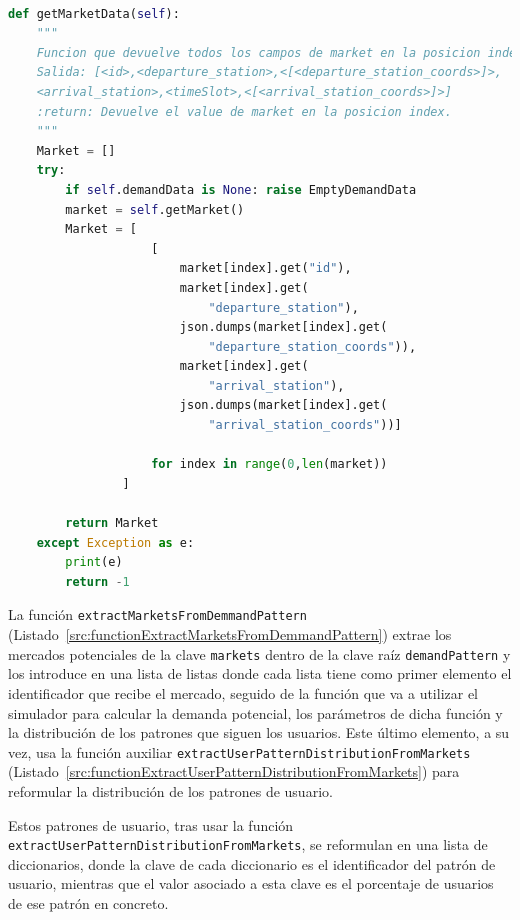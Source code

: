 \begin{lstlisting}[language=Python,
                   style=python,
                   frame=none,
                   numbers=none,
                   basicstyle=\ttfamily\normalsize,
                   caption={Función \texttt{getMarktetData}},
                   label=src:functionGetMarketData,
                   inputencoding=utf8]                   

def getMarketData(self):
    """
    Funcion que devuelve todos los campos de market en la posicion index ordenados en una lista como en el archivo Yaml.\n
    Salida: [<id>,<departure_station>,<[<departure_station_coords>]>,
    <arrival_station>,<timeSlot>,<[<arrival_station_coords>]>]
    :return: Devuelve el value de market en la posicion index.
    """
    Market = []
    try:
        if self.demandData is None: raise EmptyDemandData
        market = self.getMarket()
        Market = [
                    [
                        market[index].get("id"),
                        market[index].get(
                            "departure_station"),
                        json.dumps(market[index].get(
                            "departure_station_coords")),
                        market[index].get(
                            "arrival_station"),
                        json.dumps(market[index].get(
                            "arrival_station_coords"))]

                    for index in range(0,len(market))
                ]

        return Market
    except Exception as e:
        print(e)
        return -1
\end{lstlisting}

La función \texttt{extractMarketsFromDemmandPattern} (Listado~\ref{src:functionExtractMarketsFromDemmandPattern}) extrae los mercados potenciales de la clave \texttt{markets} dentro de la clave raíz \texttt{demandPattern} y los introduce en una lista de listas donde cada lista tiene como primer elemento el identificador que recibe el mercado, seguido de la función que va a utilizar el simulador para calcular la demanda potencial, los parámetros de dicha función y la distribución de los patrones que siguen los usuarios. Este último elemento, a su vez, usa la función auxiliar \texttt{extractUserPatternDistributionFromMarkets} (Listado~\ref{src:functionExtractUserPatternDistributionFromMarkets}) para reformular la distribución de los patrones de usuario.

Estos patrones de usuario, tras usar la función \texttt{extractUserPatternDistributionFromMarkets}, se reformulan en una lista de diccionarios, donde la clave de cada diccionario es el identificador del patrón de usuario, mientras que el valor asociado a esta clave es el porcentaje de usuarios de ese patrón en concreto.

